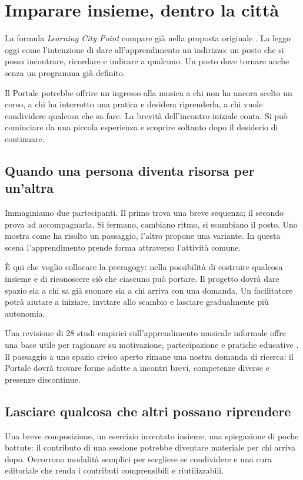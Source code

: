 \section{Imparare insieme, dentro la città}\label{sec:learning-point}

La formula \emph{Learning City Point} compare già nella proposta
originale \cite[pp.~2 e 5]{terzi_peeragogy_2016}. La leggo oggi
come l'intenzione di dare all'apprendimento un indirizzo:
un posto che si possa incontrare, ricordare e indicare a qualcuno.
Un posto dove tornare anche senza un programma già definito.

Il Portale potrebbe offrire un ingresso alla musica a chi non
ha ancora scelto un corso, a chi ha interrotto una pratica e
desidera riprenderla, a chi vuole condividere qualcosa che sa fare.
La brevità dell'incontro iniziale conta. Si può cominciare da una
piccola esperienza e scoprire soltanto dopo il desiderio di continuare.

\subsection{Quando una persona diventa risorsa per un'altra}
Immaginiamo due partecipanti. Il primo trova una breve sequenza;
il secondo prova ad accompagnarla. Si fermano, cambiano ritmo,
si scambiano il posto. Uno mostra come ha risolto un passaggio,
l'altro propone una variante. In questa scena l'apprendimento
prende forma attraverso l'attività comune.

È qui che voglio collocare la peeragogy: nella possibilità di
costruire qualcosa insieme e di riconoscere ciò che ciascuno
può portare. Il progetto dovrà dare spazio sia a chi sa già
suonare sia a chi arriva con una domanda. Un facilitatore potrà
aiutare a iniziare, invitare allo scambio e lasciare gradualmente
più autonomia.

Una revisione di 28 studi empirici sull'apprendimento musicale
informale offre una base utile per ragionare su motivazione,
partecipazione e pratiche educative \cite{weatherly2025}.
Il passaggio a uno spazio civico aperto rimane una nostra
domanda di ricerca: il Portale dovrà trovare forme adatte
a incontri brevi, competenze diverse e presenze discontinue.

\subsection{Lasciare qualcosa che altri possano riprendere}
Una breve composizione, un esercizio inventato insieme, una
spiegazione di poche battute: il contributo di una sessione
potrebbe diventare materiale per chi arriva dopo. Occorrono
modalità semplici per scegliere se condividere e una cura
editoriale che renda i contributi comprensibili e riutilizzabili.


